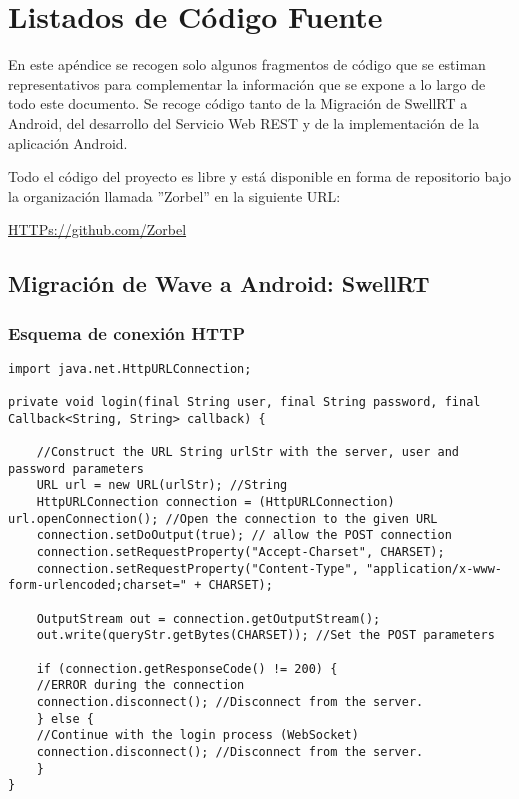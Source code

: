 \newpage
\thispagestyle{sectioned}

\appendix


\chapter{Listados de Código Fuente}

En este apéndice se recogen solo algunos fragmentos de código que se estiman representativos para complementar la información que se expone a lo largo de todo este documento. Se recoge código tanto de la Migración de SwellRT a Android, del desarrollo del Servicio Web REST y de la implementación de la aplicación Android.

Todo el código del proyecto es libre y está disponible en forma de repositorio bajo la organización llamada ''Zorbel'' en la siguiente URL:
    
    \url{HTTPs://github.com/Zorbel}    

\section{Migración de Wave a Android: SwellRT}

\subsection{Esquema de conexión HTTP}\label{ssec:codeHTTP}

	  \begin{lstlisting}[frame=single]	  
import java.net.HttpURLConnection;

private void login(final String user, final String password, final Callback<String, String> callback) {
  
    //Construct the URL String urlStr with the server, user and password parameters
    URL url = new URL(urlStr); //String 
    HttpURLConnection connection = (HttpURLConnection) url.openConnection(); //Open the connection to the given URL 
    connection.setDoOutput(true); // allow the POST connection
    connection.setRequestProperty("Accept-Charset", CHARSET);
    connection.setRequestProperty("Content-Type", "application/x-www-form-urlencoded;charset=" + CHARSET);

    OutputStream out = connection.getOutputStream(); 
    out.write(queryStr.getBytes(CHARSET)); //Set the POST parameters

    if (connection.getResponseCode() != 200) {
	//ERROR during the connection
	connection.disconnect(); //Disconnect from the server.
    } else {
	//Continue with the login process (WebSocket)
	connection.disconnect(); //Disconnect from the server.
    }		      
}	    
	  \end{lstlisting}  
	  
